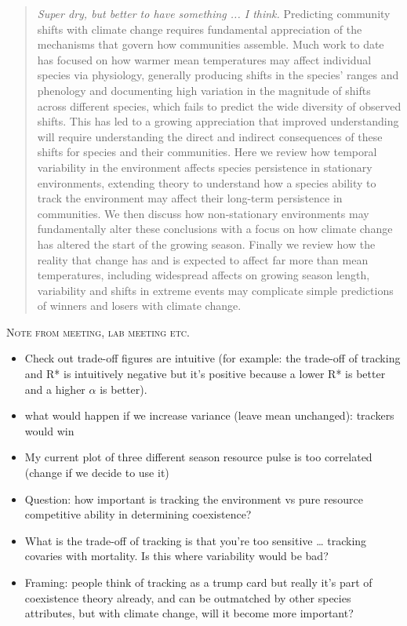 \documentclass[11pt,letterpaper]{article}
\renewcommand{\section}[1]{%
\bigskip
\begin{center}
\begin{Large}
\normalfont\scshape #1
\medskip
\end{Large}
\end{center}}
\begin{document}
\begin{abstract} \emph{Super dry, but better to have something ... I think.} Predicting community shifts with climate change requires fundamental appreciation of the mechanisms that govern how communities assemble. Much work to date has focused on how warmer mean temperatures may affect individual species via physiology, generally producing shifts in the species' ranges and phenology and documenting high variation in the magnitude of shifts across different species, which fails to predict the wide diversity of observed shifts. This has led to a growing appreciation that improved understanding will require understanding the direct and indirect consequences of these shifts for species and their communities. Here we review how temporal variability in the environment affects species persistence in stationary environments, extending theory to understand how a species ability to track the environment may affect their long-term persistence in communities. We then discuss how non-stationary environments may fundamentally alter these conclusions with a focus on how climate change has altered the start of the growing season. Finally we review how the reality that change has and is expected to affect far more than mean temperatures, including widespread affects on growing season length, variability and shifts in extreme events may complicate simple predictions of winners and losers with climate change. 
\end{abstract}

\section{Note from meeting, lab meeting etc.}
\begin{itemize}
\item Check out trade-off figures are intuitive (for example: the trade-off of tracking and R* is intuitively negative but it's positive because a lower R* is better and a higher $\alpha$ is better).
\item what would happen if we increase variance (leave mean unchanged): trackers would win
\item My current plot of three different season resource pulse is too correlated  (change if we decide to use it)
\item Question: how important is tracking the environment vs pure resource competitive ability in determining coexistence? 
\item What is the trade-off of tracking is that you’re too sensitive … tracking covaries with mortality. Is this where variability would be bad? 
\item Framing: people think of tracking as a trump card but really it’s part of coexistence theory already, and can be outmatched by other species attributes, but with climate change, will it become more important?
\end{itemize}
\end{document}
